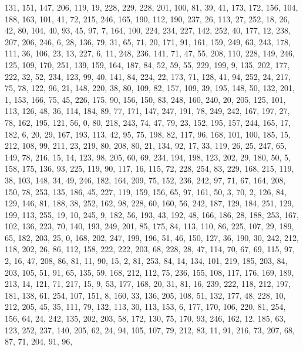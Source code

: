 \begin{DoxyCode}
       131, 151, 147, 206, 119, 19, 228, 229, 228, 201, 100, 81, 39, 41, 173, 172, 156, 104, 188, 163, 101, 41,
       72, 215, 246, 165, 190, 112, 190, 237, 26, 113, 27, 252, 18, 26, 42, 80, 104, 40, 93, 45, 97, 7, 164, 100,
       224, 234, 227, 142, 252, 40, 177, 12, 238, 207, 206, 246, 6, 28, 136, 79, 31, 65, 71, 20, 171, 91, 161, 159,
       249, 63, 243, 178, 111, 36, 106, 23, 13, 227, 6, 11, 248, 236, 141, 71, 47, 55, 208, 110, 228, 149, 246, 125,
       109, 170, 251, 139, 159, 164, 187, 84, 52, 59, 55, 229, 199, 9, 135, 202, 177, 222, 32, 52, 234, 123, 99,
       40, 141, 84, 224, 22, 173, 71, 128, 41, 94, 252, 24, 217, 75, 78, 122, 96, 21, 148, 220, 38, 80, 109, 82, 157,
       109, 39, 195, 148, 50, 132, 201, 1, 153, 166, 75, 45, 226, 175, 90, 156, 150, 83, 248, 160, 240, 20, 205,
       125, 101, 113, 126, 48, 36, 114, 184, 89, 77, 171, 147, 247, 191, 78, 249, 242, 167, 197, 27, 78, 162, 195,
       121, 56, 0, 80, 218, 243, 74, 47, 79, 23, 152, 195, 157, 244, 165, 17, 182, 6, 20, 29, 167, 193, 113, 42, 95,
       75, 198, 82, 117, 96, 168, 101, 100, 185, 15, 212, 108, 99, 211, 23, 219, 80, 208, 80, 21, 134, 92, 17, 33,
       119, 26, 25, 247, 65, 149, 78, 216, 15, 14, 123, 98, 205, 60, 69, 234, 194, 198, 123, 202, 29, 180, 50, 5,
       158, 175, 136, 93, 225, 119, 90, 117, 16, 115, 72, 228, 254, 83, 229, 168, 215, 119, 38, 103, 148, 34, 49,
       246, 182, 164, 209, 75, 152, 236, 242, 97, 71, 67, 164, 208, 150, 78, 253, 135, 186, 45, 227, 119, 159, 156,
       65, 97, 161, 50, 3, 70, 2, 126, 84, 129, 146, 81, 188, 38, 252, 162, 98, 228, 60, 160, 56, 242, 187, 129,
       184, 251, 129, 199, 113, 255, 19, 10, 245, 9, 182, 56, 193, 43, 192, 48, 166, 186, 28, 188, 253, 167, 102,
       136, 223, 70, 140, 193, 249, 201, 85, 175, 84, 113, 110, 86, 225, 107, 29, 189, 65, 182, 203, 25, 0, 168, 202,
       247, 199, 196, 51, 46, 150, 127, 36, 190, 30, 242, 212, 118, 202, 26, 86, 112, 158, 222, 222, 203, 68, 228,
       28, 47, 114, 70, 67, 69, 115, 97, 2, 16, 47, 208, 86, 81, 11, 90, 15, 2, 81, 253, 84, 14, 134, 101, 219,
       185, 203, 84, 203, 105, 51, 91, 65, 135, 59, 168, 212, 112, 75, 236, 155, 108, 117, 176, 169, 189, 213, 14,
       121, 71, 217, 15, 9, 53, 177, 168, 20, 31, 81, 16, 239, 222, 118, 212, 197, 181, 138, 61, 254, 107, 151, 8,
       160, 33, 136, 205, 108, 51, 132, 177, 48, 228, 10, 212, 205, 45, 35, 111, 79, 132, 113, 30, 113, 153, 6, 177,
       170, 106, 220, 81, 254, 156, 64, 24, 242, 135, 202, 203, 58, 172, 130, 75, 170, 93, 246, 162, 12, 185, 63,
       123, 252, 237, 140, 205, 62, 24, 94, 105, 107, 79, 212, 83, 11, 91, 216, 73, 207, 68, 87, 71, 204, 91, 96,

\end{DoxyCode}
